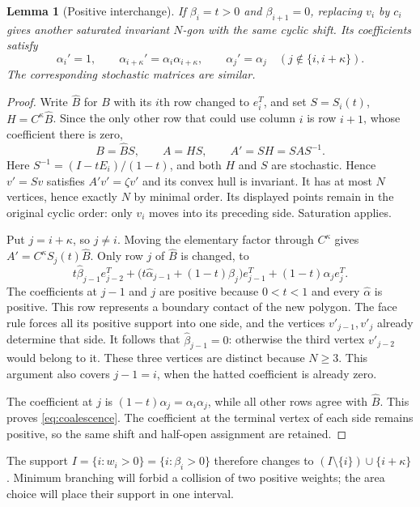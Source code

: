 \documentclass[11pt,a4paper]{article}
\newtheorem{lemma}[theorem]{Lemma}
\theoremstyle{definition}
\theoremstyle{remark}
\numberwithin{equation}{section}
\begin{document}
\begin{lemma}[Positive interchange]\label{lem:interchange}
If $\beta_i=t>0$ and $\beta_{i+1}=0$, replacing $v_i$ by $c_i$ gives another saturated invariant $N$-gon with the same cyclic shift. Its coefficients satisfy
\begin{equation}\label{eq:coalescence}
 \alpha_i'=1,\qquad \alpha_{i+\kappa}'=\alpha_i\alpha_{i+\kappa},
 \qquad \alpha_j'=\alpha_j\quad(j\notin\{i,i+\kappa\}).
\end{equation}
The corresponding stochastic matrices are similar.
\end{lemma}
\begin{proof}
Write $\widehat B$ for $B$ with its $i$th row changed to $e_i^T$, and set
$S=S_i(t)$, $H=C^\kappa\widehat B$.
Since the only other row that could use column $i$ is row $i+1$, whose coefficient there is zero,
\[
 B=\widehat B S,\qquad A=HS,\qquad A'=SH=SAS^{-1}.
\]
Here $S^{-1}=(I-tE_i)/(1-t)$, and both $H$ and $S$ are stochastic.
Hence $v'=Sv$ satisfies $A'v'=\zeta v'$ and its convex hull is invariant. It has at most $N$ vertices, hence exactly $N$ by minimal order. Its displayed points remain in the original cyclic order: only $v_i$ moves into its preceding side. Saturation applies.

Put $j=i+\kappa$, so $j\ne i$. Moving the elementary factor through $C^\kappa$ gives $A'=C^\kappa S_j(t)\widehat B$. Only row $j$ of $\widehat B$ is changed, to
\[
 t\widehat\beta_{j-1}e_{j-2}^T
 +\bigl(t\widehat\alpha_{j-1}+(1-t)\beta_j\bigr)e_{j-1}^T
 +(1-t)\alpha_j e_j^T.
\]
The coefficients at $j-1$ and $j$ are positive because $0<t<1$ and every $\widehat\alpha$ is positive. This row represents a boundary contact of the new polygon. The face rule forces all its positive support into one side, and the vertices $v'_{j-1},v'_j$ already determine that side. It follows that $\widehat\beta_{j-1}=0$: otherwise the third vertex $v'_{j-2}$ would belong to it. These three vertices are distinct because $N\ge3$. This argument also covers $j-1=i$, when the hatted coefficient is already zero.

The coefficient at $j$ is $(1-t)\alpha_j=\alpha_i\alpha_j$, while all other rows agree with $\widehat B$. This proves \eqref{eq:coalescence}. The coefficient at the terminal vertex of each side remains positive, so the same shift and half-open assignment are retained.
\end{proof}

The support $I=\{i:w_i>0\}=\{i:\beta_i>0\}$ therefore changes to
$(I\setminus\{i\})\cup\{i+\kappa\}$. Minimum branching will forbid
a collision of two positive weights; the area choice will place their
support in one interval.
\end{document}
